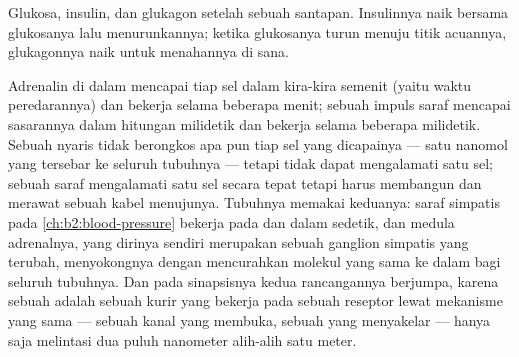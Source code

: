 \begin{omfigure}

{\small Glukosa, insulin, dan glukagon setelah sebuah santapan.
Insulinnya naik bersama glukosanya lalu menurunkannya; ketika
glukosanya turun menuju titik acuannya, glukagonnya naik untuk
menahannya di sana.}
\end{omfigure}

\begin{example}\label{ex:b2:cell-signalling:compare}
Adrenalin di dalam  mencapai tiap sel dalam kira-kira semenit
(yaitu waktu peredarannya) dan bekerja selama beberapa menit; sebuah
impuls saraf mencapai sasarannya dalam hitungan milidetik dan bekerja
selama beberapa milidetik. Sebuah  nyaris tidak berongkos apa pun
tiap sel yang dicapainya --- satu nanomol yang tersebar ke seluruh
tubuhnya --- tetapi tidak dapat mengalamati satu sel; sebuah saraf
mengalamati satu sel secara tepat tetapi harus membangun dan merawat
sebuah kabel menujunya. Tubuhnya memakai keduanya: saraf simpatis pada
\cref{ch:b2:blood-pressure} bekerja pada  dan  dalam
sedetik, dan medula adrenalnya, yang dirinya sendiri merupakan sebuah
ganglion simpatis yang terubah, menyokongnya dengan mencurahkan molekul
yang sama ke dalam  bagi seluruh tubuhnya. Dan pada sinapsisnya
kedua rancangannya berjumpa, karena sebuah  adalah
sebuah kurir yang bekerja pada sebuah reseptor lewat mekanisme yang
sama --- sebuah kanal yang membuka, sebuah  yang menyakelar
--- hanya saja melintasi dua puluh nanometer alih-alih satu meter.
\end{example}

